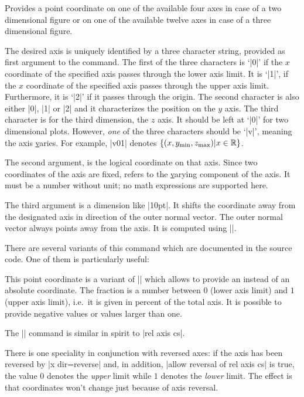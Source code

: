 \begin{command}{\pgfplotsqpointoutsideofaxis{}}
	Provides a point coordinate on one of the available four axes in case of a two dimensional figure or on one of the available twelve axes in case of a three dimensional figure.
	
	The desired axis is uniquely identified by a three character string, provided as first argument to the command. The first of the three characters is `|0|' if the $x$ coordinate of the specified axis passes through the lower axis limit. It is `|1|', if the $x$ coordinate of the specified axis passes through the upper axis limit. Furthermore, it is `|2|' if it passes through the origin. The second character is also either |0|, |1| or |2| and it characterizes the position on the $y$ axis. The third character is for the third dimension, the $z$ axis. It should be left at `|0|' for two dimensional plots. However, \emph{one} of the three characters should be `|v|', meaning the axis \underline varies. For example, |v01| denotes $\{ (x,y_{\text{min}},z_{\text{max}}) \vert x \in \mathbb{R} \}$.
	
	The second argument,  is the logical coordinate on that axis. Since two coordinates of the axis are fixed,  refers to the \underline varying component of the axis. It must be a number without unit; no math expressions are supported here.

	The third argument  is a dimension like |10pt|. It shifts the coordinate away from the designated axis in direction of the outer normal vector. The outer normal vector always points away from the axis. It is computed using
	|\pgfplotspointouternormalvectorofaxis|.

	There are several variants of this command which are documented in the source code. One of them is particularly useful:
\end{command}

\begin{command}{\pgfplotsqpointoutsideofaxisrel{}}
	This point coordinate is a variant of |\pgfplotsqpointoutsideofaxis| which allows to provide an  instead of an absolute coordinate. The fraction is a number between $0$ (lower axis limit) and $1$ (upper axis limit), i.e.\ it is given in percent of the total axis. It is possible to provide negative values or values larger than one.

	The |\pgfplotsqpointoutsideofaxisrel| command is similar in spirit to |rel axis cs|.

	There is one speciality in conjunction with reversed axes: if the axis has been reversed by |x dir=reverse| and, in addition, |allow reversal of rel axis cs| is true, the value $0$ denotes the \emph{upper} limit while $1$ denotes the \emph{lower} limit. The effect is that coordinates won't change just because of axis reversal.
%
\end{command}

